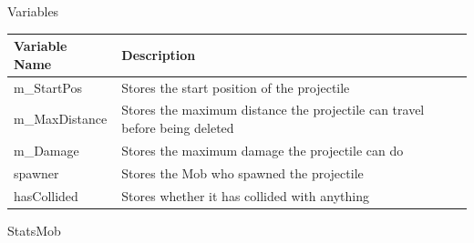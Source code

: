 \documentclass{article}
\begin{document}
                \begin{center}
                    Variables
                    \begin{tabular}{ | m{} | m{} | }
                        \hline
                        \textbf{Variable Name} & \textbf{Description} \\
                        \hline
                        m\_StartPos & Stores the start position of the projectile \\
                        \hline
                        m\_MaxDistance & Stores the maximum distance the projectile can travel before being deleted \\
                        \hline
                        m\_Damage & Stores the maximum damage the projectile can do \\
                        \hline
                        spawner & Stores the Mob who spawned the projectile \\
                        \hline
                        hasCollided & Stores whether it has collided with anything \\
                        \hline
                    \end{tabular}
                \end{center}
                StatsMob
\end{document}
